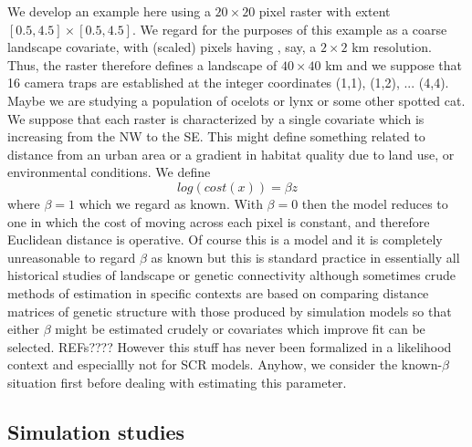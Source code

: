 We develop an example here using a $20 \times 20$ pixel raster with
extent $[0.5, 4.5] \times [0.5, 4.5]$.
We regard for the purposes of this example as a coarse landscape 
covariate, with (scaled) pixels having ,  say, a $2 \times 2$ km resolution. Thus, the raster
therefore
defines a landscape of $40 \times 40$ km and we suppose that 16 camera
traps are established at the integer coordinates (1,1), (1,2),
... (4,4). 
Maybe we are studying a population of ocelots or lynx or some other
spotted cat.
We suppose 
that each raster is characterized by a single covariate which is increasing 
from the NW to the SE. This might define something related to distance
from an urban area or a gradient in habitat quality due to land use,
or environmental conditions. 
We define 
\[
 log(cost(x))=  \beta z 
 \]
where $\beta = 1$ which we regard as known. With $\beta=0$ then the model reduces to
one in which the cost of moving across each pixel is constant, and therefore Euclidean
distance is operative.
 Of course this is a model and it is completely
unreasonable to regard $\beta$ as known but this is standard practice in essentially all
historical studies of landscape or genetic connectivity although sometimes crude methods
of estimation in specific contexts are based on comparing distance matrices of genetic
structure with those produced by simulation models so that either $\beta$ might be estimated
crudely or covariates which improve fit can be selected. REFs????
However this stuff has never been formalized in a likelihood context and especiallly
not for SCR models. 
Anyhow, we consider the known-$\beta$ situation first before dealing with estimating
this parameter. 


\subsection{Simulation studies}

